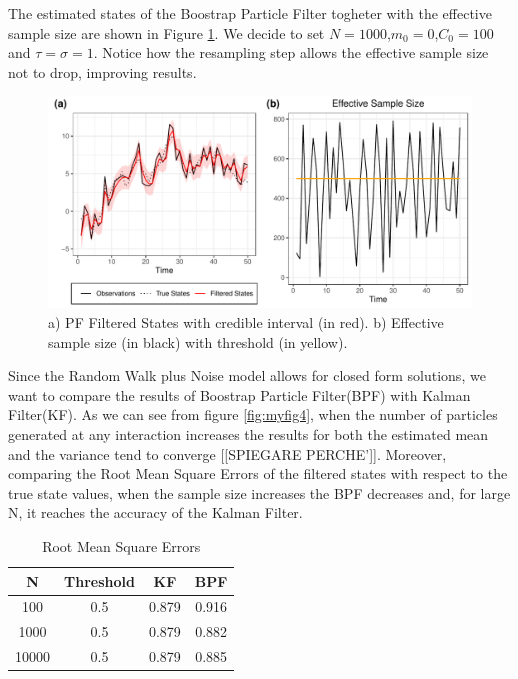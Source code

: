 \documentclass[
]{book}
\theoremstyle{break}
\theoremstyle{nonumberplain}
\begin{document}
The estimated states of the Boostrap Particle Filter togheter with the
effective sample size are shown in Figure \ref{fig:myfig3}. We decide to
set \(N=1000\),\(m_{0}=0\),\(C_{0}=100\) and \(\tau=\sigma=1\). Notice
how the resampling step allows the effective sample size not to drop,
improving results.

\begin{figure}[H]

{\centering \includegraphics{prova_knit_finale_files/figure-latex/myfig3-1} 

}

\caption{a) PF Filtered States with credible interval (in red). b) Effective sample size (in black) with threshold (in yellow).}\label{fig:myfig3}
\end{figure}

Since the Random Walk plus Noise model allows for closed form solutions,
we want to compare the results of Boostrap Particle Filter(BPF) with
Kalman Filter(KF). As we can see from figure \ref{fig:myfig4}, when the
number of particles generated at any interaction increases the results
for both the estimated mean and the variance tend to converge
{[}{[}SPIEGARE PERCHE'{]}{]}. Moreover, comparing the Root Mean Square
Errors of the filtered states with respect to the true state values,
when the sample size increases the BPF decreases and, for large N, it
reaches the accuracy of the Kalman Filter.

\begin{longtable}[t]{cccc}
\caption{\label{tab:unnamed-chunk-12}Root Mean Square Errors}\\
\toprule
N & Threshold & KF & BPF\\
\midrule
100 & 0.5 & 0.879 & 0.916\\
1000 & 0.5 & 0.879 & 0.882\\
10000 & 0.5 & 0.879 & 0.885\\
\bottomrule
\end{longtable}
\end{document}
